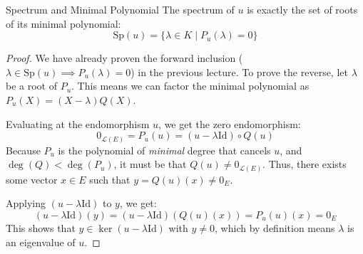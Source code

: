 \documentclass[11pt, a4paper]{article}
\begin{document}
\begin{theorem}{Spectrum and Minimal Polynomial}{}
The spectrum of $u$ is exactly the set of roots of its minimal polynomial:
$$ \text{Sp}(u) = \{ \lambda \in K \mid P_u(\lambda) = 0 \} $$ 
\end{theorem}
\begin{proof}
We have already proven the forward inclusion ($\lambda \in \text{Sp}(u) \implies P_u(\lambda) = 0$) in the previous lecture. 
To prove the reverse, let $\lambda$ be a root of $P_u$. 
This means we can factor the minimal polynomial as $P_u(X) = (X - \lambda)Q(X)$. 

Evaluating at the endomorphism $u$, we get the zero endomorphism:
$$ 0_{\mathcal{L}(E)} = P_u(u) = (u - \lambda \text{Id}) \circ Q(u) $$ 
Because $P_u$ is the polynomial of \textit{minimal} degree that cancels $u$, and $\deg(Q) < \deg(P_u)$, it must be that $Q(u) \neq 0_{\mathcal{L}(E)}$. 
Thus, there exists some vector $x \in E$ such that $y = Q(u)(x) \neq 0_E$. 

Applying $(u - \lambda \text{Id})$ to $y$, we get:
$$ (u - \lambda \text{Id})(y) = (u - \lambda \text{Id})(Q(u)(x)) = P_u(u)(x) = 0_E $$ 
This shows that $y \in \ker(u - \lambda \text{Id})$ with $y \neq 0$, which by definition means $\lambda$ is an eigenvalue of $u$. 
\end{proof}
\end{document}
